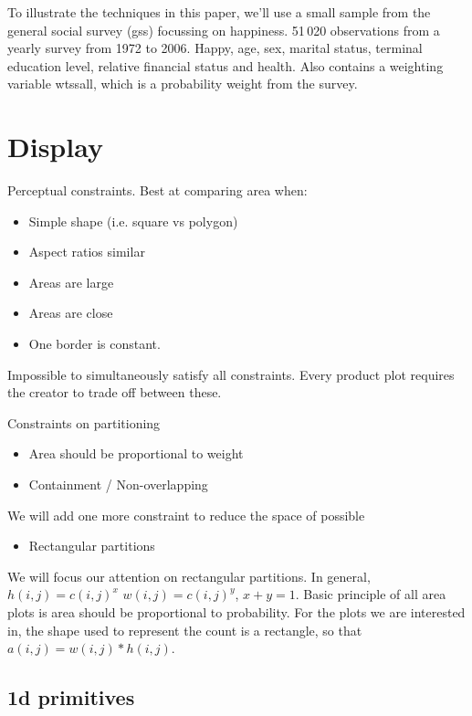 \documentclass[letterpaper,oneside]{scrartcl}
\begin{document}
To illustrate the techniques in this paper, we'll use a small sample from the general social survey ({\sc gss}) focussing on happiness. 51\,020 observations from a yearly survey from 1972 to 2006.  Happy, age, sex, marital status, terminal education level, relative financial status and health.  Also contains a weighting variable wtssall, which is a probability weight from the survey.


\section{Display}
\label{sec:display}

Perceptual constraints.  Best at comparing area when:

\begin{itemize}
  \item Simple shape (i.e. square vs polygon)
  \item Aspect ratios similar
  \item Areas are large
  \item Areas are close
  \item One border is constant.
\end{itemize}

Impossible to simultaneously satisfy all constraints.  Every product plot requires the creator to trade off between these.  

Constraints on partitioning

\begin{itemize}
  \item Area should be proportional to weight
  \item Containment / Non-overlapping
\end{itemize}

We will add one more constraint to reduce the space of possible

\begin{itemize}
  \item Rectangular partitions
\end{itemize}

We will focus our attention on rectangular partitions.  In general,  $h(i, j) = c(i, j)^x$ $w(i, j) = c(i, j)^y$, $x + y = 1$.   Basic principle of all area plots is area should be proportional to probability. For the plots we are interested in, the shape used to represent the count is a rectangle, so that $a(i, j) = w(i, j) * h(i, j)$.

\subsection{1d primitives}
\end{document}
